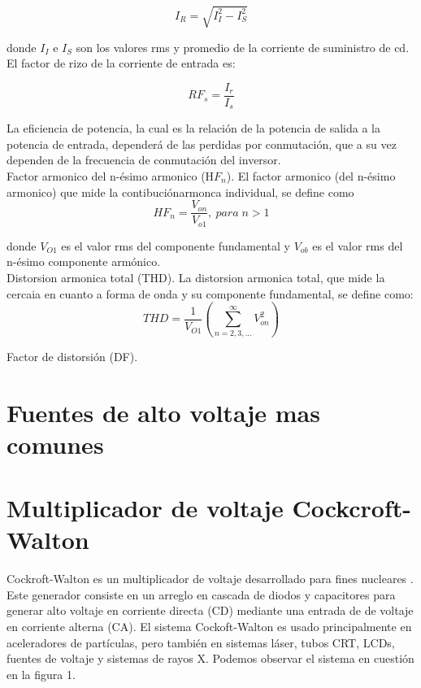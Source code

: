 \begin{equation}
I_{R}=\sqrt{I_{I}^{2}-I_{S}^{2}}
\end{equation}

donde $I_{I}$ e $I_{S}$ son los valores rms y promedio de la corriente de suministro de cd.
El factor de rizo de la corriente de entrada es: 

\begin{equation}
RF_{s}=\dfrac{I_{r}}{I_{s}}
\end{equation}

La eficiencia de potencia, la cual es la relación de la potencia de salida a la potencia de entrada, dependerá de las perdidas por conmutación, que a su vez dependen de la frecuencia de conmutación del inversor.\\

Factor armonico del n-ésimo armonico (H$F_{n}$). El factor armonico (del n-ésimo armonico) que mide la contibuciónarmonca individual, se define como \begin{equation}
HF_{n}=\dfrac{V_{on}}{V_{o1}}, \: para\; n>1
\end{equation}

donde $V_{O1}$ es el valor rms del componente fundamental y $V_{ob}$ es el valor rms del n-ésimo componente armónico.\\

Distorsion armonica total (THD). La distorsion armonica total, que mide la cercaia en cuanto a forma de onda y su componente fundamental, se define como: \begin{equation}
THD=\dfrac{1}{V_{O1}}(\sum_{n=2,3,...}^{\infty }V_{on}^{2})
\end{equation}

Factor de distorsión (DF). 
\section{Fuentes de alto voltaje mas comunes}


\section{Multiplicador de voltaje Cockcroft-Walton}
Cockroft-Walton es un multiplicador de voltaje desarrollado para fines nucleares \cite{CERN}. Este generador consiste en un arreglo en cascada de diodos y capacitores para generar alto voltaje en corriente directa (CD) mediante una entrada de de voltaje en corriente alterna (CA). El sistema Cockoft-Walton es usado principalmente en aceleradores de partículas, pero también en sistemas láser, tubos CRT, LCDs, fuentes de voltaje y sistemas de rayos X. Podemos observar el sistema en cuestión en la figura 1.  

